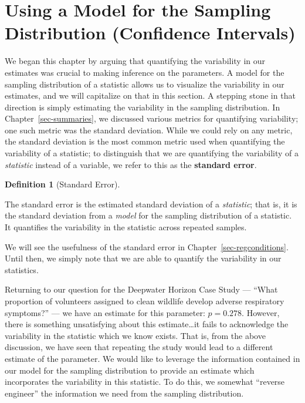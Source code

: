 \documentclass[
  letterpaper,
  DIV=11,
  numbers=noendperiod]{scrreprt}
\theoremstyle{definition}
\newtheorem{definition}{Definition}[chapter]
\theoremstyle{definition}
\theoremstyle{plain}
\theoremstyle{remark}
\begin{document}
\section{Using a Model for the Sampling Distribution (Confidence
Intervals)}\label{using-a-model-for-the-sampling-distribution-confidence-intervals}

We began this chapter by arguing that quantifying the variability in our
estimates was crucial to making inference on the parameters. A model for
the sampling distribution of a statistic allows us to visualize the
variability in our estimates, and we will capitalize on that in this
section. A stepping stone in that direction is simply estimating the
variability in the sampling distribution. In
Chapter~\ref{sec-summaries}, we discussed various metrics for
quantifying variability; one such metric was the standard deviation.
While we could rely on any metric, the standard deviation is the most
common metric used when quantifying the variability of a statistic; to
distinguish that we are quantifying the variability of a
\emph{statistic} instead of a variable, we refer to this as the
\textbf{standard error}.

\begin{definition}[Standard
Error]\protect\hypertarget{def-standard-error}{}\label{def-standard-error}

The standard error is the estimated standard deviation of a
\emph{statistic}; that is, it is the standard deviation from a
\emph{model} for the sampling distribution of a statistic. It quantifies
the variability in the statistic across repeated samples.

\end{definition}

We will see the usefulness of the standard error in
Chapter~\ref{sec-regconditions}. Until then, we simply note that we are
able to quantify the variability in our statistics.

Returning to our question for the Deepwater Horizon Case Study ---
``What proportion of volunteers assigned to clean wildlife develop
adverse respiratory symptoms?'' --- we have an estimate for this
parameter: \(\widehat{p} = 0.278\). However, there is something
unsatisfying about this estimate\ldots it fails to acknowledge the
variability in the statistic which we know exists. That is, from the
above discussion, we have seen that repeating the study would lead to a
different estimate of the parameter. We would like to leverage the
information contained in our model for the sampling distribution to
provide an estimate which incorporates the variability in this
statistic. To do this, we somewhat ``reverse engineer'' the information
we need from the sampling distribution.
\end{document}
